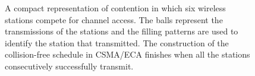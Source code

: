 \documentclass[journal]{IEEEtran}
\begin{document}
\begin{figure}[!t]
\centering
{}
\caption{A compact representation of contention in which six wireless stations compete for channel access. The balls represent the transmissions of the stations and the filling patterns are used to identify the station that transmitted. The construction of the collision-free schedule in CSMA/ECA finishes when all the stations consecutively successfully transmit.}
\label{fig:ca_vs_eca_compact}
\end{figure}
\end{document}
